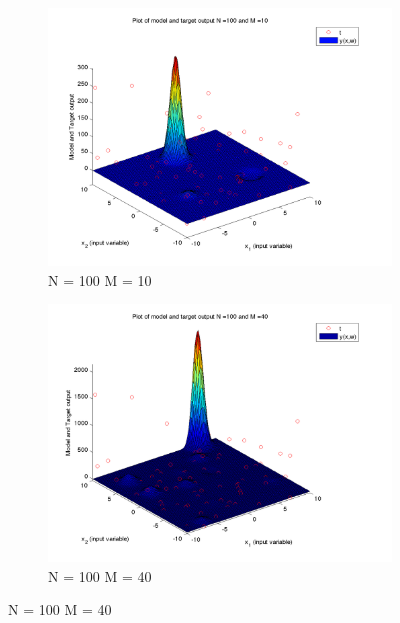 \documentclass{article}
\begin{document}
\begin{figure}[H]

\begin{subfigure}{.5\textwidth}
\centering
\includegraphics[width=\linewidth]{D2/VaryingM_N100M10}
\caption{N = 100 M = 10}
\end{subfigure}
\begin{subfigure}{.5\textwidth}
\includegraphics[width=\linewidth]{D2/VaryingM_N100M40}
\caption{N = 100 M = 40}
\end{subfigure}



\end{figure}
\end{document}
